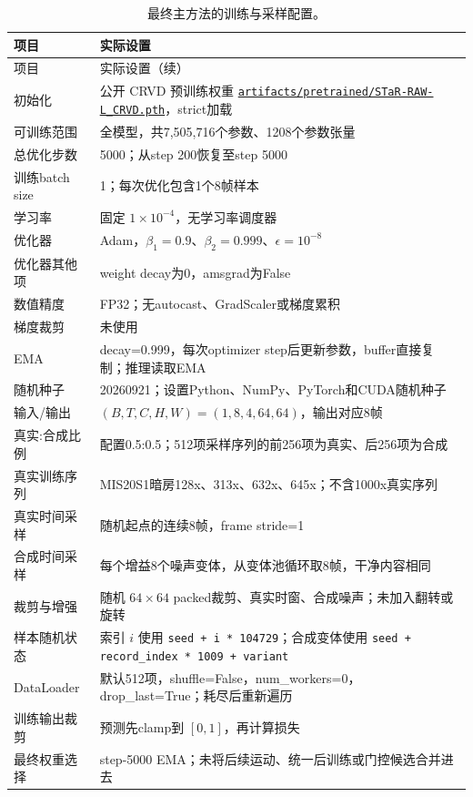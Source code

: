 \documentclass[11pt,a4paper,UTF8,fontset=fandol]{ctexart}
\newcommand{\repofile}[1]{\href{https://github.com/JingZe-Liang/SigmaStar_AIISP/blob/main/Stage2/9_19-10_1/Task3/XWJ/RECOVERED_Stage2_DenoiseModel_20261010/#1}{\nolinkurl{#1}}}
\begin{document}
\begin{longtable}{P{0.27\textwidth}P{0.65\textwidth}}
\caption{最终主方法的训练与采样配置。}\label{tab:training_config}\\
\toprule 项目 & 实际设置 \\ \midrule
\endfirsthead
\toprule 项目 & 实际设置（续） \\ \midrule
\endhead
\bottomrule\endfoot
初始化 & 公开 CRVD 预训练权重 \repofile{artifacts/pretrained/STaR-RAW-L_CRVD.pth}，strict加载 \\
可训练范围 & 全模型，共7,505,716个参数、1208个参数张量 \\
总优化步数 & 5000；从step 200恢复至step 5000 \\
训练batch size & 1；每次优化包含1个8帧样本 \\
学习率 & 固定 $1\times10^{-4}$，无学习率调度器 \\
优化器 & Adam，$\beta_1=0.9$、$\beta_2=0.999$、$\epsilon=10^{-8}$ \\
优化器其他项 & weight decay为0，amsgrad为False \\
数值精度 & FP32；无autocast、GradScaler或梯度累积 \\
梯度裁剪 & 未使用 \\
EMA & decay=0.999，每次optimizer step后更新参数，buffer直接复制；推理读取EMA \\
随机种子 & 20260921；设置Python、NumPy、PyTorch和CUDA随机种子 \\
输入/输出 & $(B,T,C,H,W)=(1,8,4,64,64)$，输出对应8帧 \\
真实:合成比例 & 配置0.5:0.5；512项采样序列的前256项为真实、后256项为合成 \\
真实训练序列 & MIS20S1暗房128x、313x、632x、645x；不含1000x真实序列 \\
真实时间采样 & 随机起点的连续8帧，frame stride=1 \\
合成时间采样 & 每个增益8个噪声变体，从变体池循环取8帧，干净内容相同 \\
裁剪与增强 & 随机 $64\times64$ packed裁剪、真实时窗、合成噪声；未加入翻转或旋转 \\
样本随机状态 & 索引 $i$ 使用 \texttt{seed + i * 104729}；合成变体使用 \texttt{seed + record\_index * 1009 + variant} \\
DataLoader & 默认512项，shuffle=False，num\_workers=0，drop\_last=True；耗尽后重新遍历 \\
训练输出裁剪 & 预测先clamp到 $[0,1]$，再计算损失 \\
最终权重选择 & step-5000 EMA；未将后续运动、统一后训练或门控候选合并进去 \\
\end{longtable}
\end{document}
